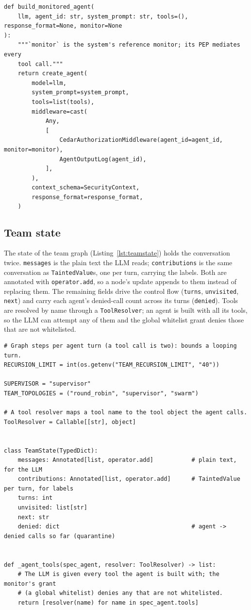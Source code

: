 \documentclass[11pt,a4paper]{article}
\DeclareRobustCommand{\code}[1]{{\renewcommand{\_}{\textunderscore\allowbreak}\texttt{#1}}}
\begin{document}
\begin{lstlisting}[firstnumber=16,style=py,caption={Building a monitored agent (\texttt{systems/agent.py}, lines 16--34)},label={lst:agent}]
def build_monitored_agent(
    llm, agent_id: str, system_prompt: str, tools=(), response_format=None, monitor=None
):
    """`monitor` is the system's reference monitor; its PEP mediates every
    tool call."""
    return create_agent(
        model=llm,
        system_prompt=system_prompt,
        tools=list(tools),
        middleware=cast(
            Any,
            [
                CedarAuthorizationMiddleware(agent_id=agent_id, monitor=monitor),
                AgentOutputLog(agent_id),
            ],
        ),
        context_schema=SecurityContext,
        response_format=response_format,
    )
\end{lstlisting}

\subsection{Team state}

The state of the team graph (Listing~\ref{lst:teamstate}) holds the conversation twice.
\code{messages} is the plain text the LLM reads; \code{contributions} is the same
conversation as \code{TaintedValue}s, one per turn, carrying the labels. Both are
annotated with \code{operator.add}, so a node's update appends to them instead of
replacing them. The remaining fields drive the control flow (\code{turns},
\code{unvisited}, \code{next}) and carry each agent's denied-call count across its
turns (\code{denied}). Tools are resolved by name through a \code{ToolResolver}; an agent
is built with all its tools, so the LLM can attempt any of them and the global whitelist
grant denies those that are not whitelisted.

\begin{lstlisting}[firstnumber=34,style=py,caption={Team state, limits and tool resolution (\texttt{systems/graph.py}, lines 34--56)},label={lst:teamstate}]
# Graph steps per agent turn (a tool call is two): bounds a looping turn.
RECURSION_LIMIT = int(os.getenv("TEAM_RECURSION_LIMIT", "40"))

SUPERVISOR = "supervisor"
TEAM_TOPOLOGIES = ("round_robin", "supervisor", "swarm")

# A tool resolver maps a tool name to the tool object the agent calls.
ToolResolver = Callable[[str], object]


class TeamState(TypedDict):
    messages: Annotated[list, operator.add]           # plain text, for the LLM
    contributions: Annotated[list, operator.add]      # TaintedValue per turn, for labels
    turns: int
    unvisited: list[str]
    next: str
    denied: dict                                      # agent -> denied calls so far (quarantine)


def _agent_tools(spec_agent, resolver: ToolResolver) -> list:
    # The LLM is given every tool the agent is built with; the monitor's grant
    # (a global whitelist) denies any that are not whitelisted.
    return [resolver(name) for name in spec_agent.tools]
\end{lstlisting}
\end{document}

